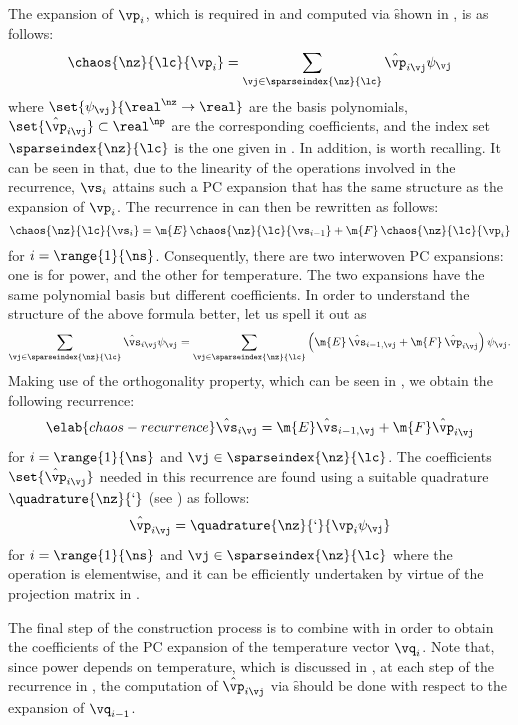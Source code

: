 The expansion of $\vp_i$, which is required in 
and computed via \f shown in , is as follows:
\[
  \chaos{\nz}{\lc}{\vp_i} = \sum_{\vj \in \sparseindex{\nz}{\lc}} \hat{\vp}_{i \vj} \psi_{\vj}
\]
where $\set{\psi_{\vj}}{\real^\nz \to \real}$ are the basis polynomials,
$\set{\hat{\vp}_{i \vj}} \subset \real^\np$ are the corresponding coefficients,
and the index set $\sparseindex{\nz}{\lc}$ is the one given in
. In addition,
 is worth recalling. It can be seen in
 that, due to the linearity of the operations
involved in the recurrence, $\vs_i$ attains such a \ac{PC} expansion that has
the same structure as the expansion of $\vp_i$. The recurrence in
 can then be rewritten as follows:
\[
  \chaos{\nz}{\lc}{\vs_i} = \m{E} \, \chaos{\nz}{\lc}{\vs_{i - 1}} + \m{F} \, \chaos{\nz}{\lc}{\vp_i}
\]
for $i = \range{1}{\ns}$. Consequently, there are two interwoven \ac{PC}
expansions: one is for power, and the other for temperature. The two expansions
have the same polynomial basis but different coefficients. In order to
understand the structure of the above formula better, let us spell it out as
\[
  \sum_{\vj \in \sparseindex{\nz}{\lc}} \hat{\vs}_{i \vj} \psi_{\vj} =
  \sum_{\vj \in \sparseindex{\nz}{\lc}} \left(\m{E} \, \hat{\vs}_{i - 1, \vj} + \m{F} \, \hat{\vp}_{i \vj}\right) \psi_{\vj}.
\]
Making use of the orthogonality property, which can be seen in
, we obtain the following recurrence:
\begin{equation} \elab{chaos-recurrence}
  \hat{\vs}_{i \vj} = \m{E} \hat{\vs}_{i - 1, \vj} + \m{F} \hat{\vp}_{i \vj}
\end{equation}
for $i = \range{1}{\ns}$ and $\vj \in \sparseindex{\nz}{\lc}$. The coefficients
$\set{\hat{\vp}_{i \vj}}$ needed in this recurrence are found using a suitable
quadrature $\quadrature{\nz}{\lq}$ (see ) as
follows:
\[
  \hat{\vp}_{i \vj} = \quadrature{\nz}{\lq}{\vp_i \psi_{\vj}}
\]
for $i = \range{1}{\ns}$ and $\vj \in \sparseindex{\nz}{\lc}$ where the
operation is elementwise, and it can be efficiently undertaken by virtue of the
projection matrix in .

The final step of the construction process is to combine 
with  in order to obtain the coefficients of the
\ac{PC} expansion of the temperature vector $\vq_i$. Note that, since power
depends on temperature, which is discussed in , at each step
of the recurrence in , the computation of $\hat{\vp}_{i
\vj}$ via \f should be done with respect to the expansion of $\vq_{i - 1}$.

